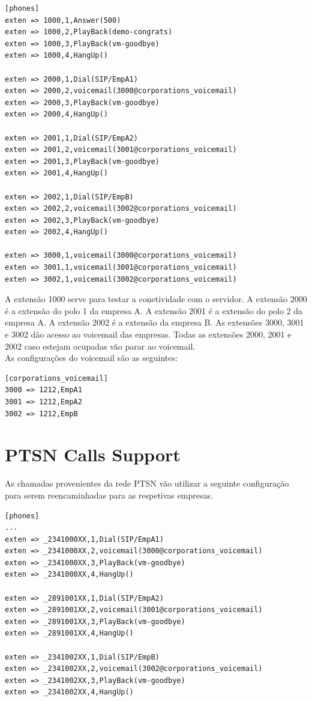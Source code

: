 \documentclass[11pt,a4paper]{report}
\begin{document}
\begin{lstlisting}[caption=SIP Proxy 1 - /etc/asterisk/extensions.conf]
[phones]
exten => 1000,1,Answer(500)
exten => 1000,2,PlayBack(demo-congrats)
exten => 1000,3,PlayBack(vm-goodbye)
exten => 1000,4,HangUp()

exten => 2000,1,Dial(SIP/EmpA1)
exten => 2000,2,voicemail(3000@corporations_voicemail)
exten => 2000,3,PlayBack(vm-goodbye)
exten => 2000,4,HangUp()

exten => 2001,1,Dial(SIP/EmpA2)
exten => 2001,2,voicemail(3001@corporations_voicemail)
exten => 2001,3,PlayBack(vm-goodbye)
exten => 2001,4,HangUp()

exten => 2002,1,Dial(SIP/EmpB)
exten => 2002,2,voicemail(3002@corporations_voicemail)
exten => 2002,3,PlayBack(vm-goodbye)
exten => 2002,4,HangUp()

exten => 3000,1,voicemail(3000@corporations_voicemail)
exten => 3001,1,voicemail(3001@corporations_voicemail)
exten => 3002,1,voicemail(3002@corporations_voicemail)
\end{lstlisting}

A extensão 1000 serve para testar a conetividade com o servidor. 
A extensão 2000 é a extensão do polo 1 da empresa A. 
A extensão 2001 é a extensão do polo 2 da empresa A. 
A extensão 2002 é a extensão da empresa B. 
As extensões 3000, 3001 e 3002 dão acesso ao voicemail das empresas.
Todas as extensões 2000, 2001 e 2002 caso estejam ocupadas vão parar ao voicemail.\\

As configurações do voicemail são as seguintes:

\begin{lstlisting}[caption=SIP Proxy 1 - /etc/asterisk/voicemail.conf]
[corporations_voicemail]
3000 => 1212,EmpA1
3001 => 1212,EmpA2
3002 => 1212,EmpB
\end{lstlisting}


\section{PTSN Calls Support}

As chamadas provenientes da rede PTSN vão utilizar a seguinte configuração para serem reencaminhadas para as respetivas empresas.

\begin{lstlisting}[caption=SIP Proxy 1 - /etc/asterisk/extensions.conf]
[phones]
...
exten => _2341000XX,1,Dial(SIP/EmpA1)
exten => _2341000XX,2,voicemail(3000@corporations_voicemail)
exten => _2341000XX,3,PlayBack(vm-goodbye)
exten => _2341000XX,4,HangUp()

exten => _2891001XX,1,Dial(SIP/EmpA2)
exten => _2891001XX,2,voicemail(3001@corporations_voicemail)
exten => _2891001XX,3,PlayBack(vm-goodbye)
exten => _2891001XX,4,HangUp()

exten => _2341002XX,1,Dial(SIP/EmpB)
exten => _2341002XX,2,voicemail(3002@corporations_voicemail)
exten => _2341002XX,3,PlayBack(vm-goodbye)
exten => _2341002XX,4,HangUp()
\end{lstlisting}
\end{document}
